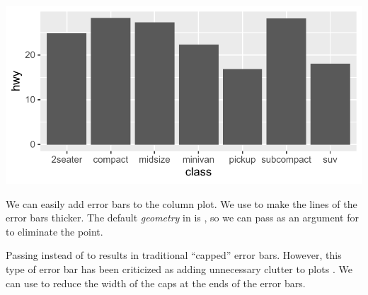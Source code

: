 \documentclass[krantz2]{krantz}\usepackage{knitr}
\begin{document}
\begin{knitrout}\footnotesize
{}\color{fgcolor}\begin{kframe}
\begin{alltt}
  \hlopt{+}
  \hlstd{(} \hlstd{=} \hlstd{,}  
\end{alltt}
\end{kframe}

{\centering \includegraphics[width=.7\textwidth]{figure/pos-summary-plot-09a-1}

}



\end{knitrout}

We can easily add error bars to the column plot. We use  to make the lines of the error bars thicker. The default \emph{geometry} in  is , so we can pass  as an argument for  to eliminate the point.

\begin{knitrout}\footnotesize
{}\color{fgcolor}\begin{kframe}
\begin{alltt}
  \hlstd{(} \hlstd{=} \hlstd{,}  \hlstd{=} \hlstd{,}
                \hlstd{=} \hlstd{,}  \hlstd{=} \hlstd{)}
\end{alltt}
\end{kframe}
\end{knitrout}

Passing  instead of  to  results in traditional ``capped'' error bars. However, this type of error bar has been criticized as adding unnecessary clutter to plots \autocite{Tufte1983}. We can use  to reduce the width of the caps at the ends of the error bars.
\end{document}
